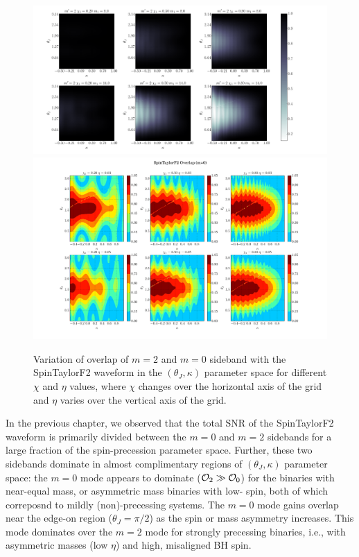 \label{fig:P2}  \begin{figure}[t]
\includegraphics[width=\textwidth]{./images/OVLP_GRID_P2.pdf}
\includegraphics[width=\textwidth]{./images/OVLP_GRID_P0.pdf} \caption{Variation
of overlap of $m=2$ and $m=0$ sideband with the SpinTaylorF2
waveform in the $(\theta_J, \kappa)$ parameter space for  different $\chi$ and
$\eta$ values, where $\chi$ changes over the horizontal  axis of the grid and
$\eta$ varies over the vertical axis of the grid.}  
\centering  
\end{figure}

In the previous chapter, we observed that the total SNR of the SpinTaylorF2
waveform is primarily divided between the $m=0$ and $m=2$ sidebands for a
large fraction of the spin-precession parameter space. Further, these two
sidebands dominate in almost complimentary regions of $(\theta_J, \kappa)$
parameter space: the $m=0$ mode appears to dominate (${\cal O}_2 \gg {\cal
O}_0$) for the binaries with near-equal mass, or asymmetric mass binaries with
low- spin, both of which correposnd to mildly (non)-precessing systems. The
$m=0$ mode gains overlap near the edge-on region ($\theta_J=\pi/2$) as the
spin or mass asymmetry increases. This mode dominates over the $m=2$ mode for
strongly precessing binaries, i.e., with asymmetric masses (low $\eta$) and
high, misaligned BH spin.